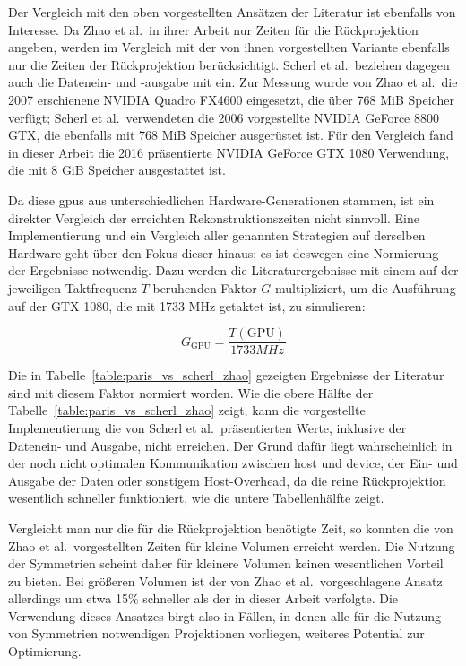 Der Vergleich mit den oben vorgestellten Ansätzen der Literatur ist ebenfalls von Interesse. Da Zhao et al.\ in ihrer
Arbeit nur Zeiten für die Rückprojektion angeben, werden im Vergleich mit der von ihnen vorgestellten Variante ebenfalls
nur die Zeiten der Rückprojektion berücksichtigt. Scherl et al.\ beziehen dagegen auch die Datenein- und -ausgabe mit
ein. Zur Messung wurde von Zhao et al.\ die 2007 erschienene NVIDIA Quadro FX4600 eingesetzt, die über 768 MiB Speicher
verfügt; Scherl et al.\ verwendeten die 2006 vorgestellte NVIDIA GeForce 8800 GTX, die ebenfalls mit 768 MiB Speicher
ausgerüstet ist. Für den Vergleich fand in dieser Arbeit die 2016 präsentierte NVIDIA GeForce GTX 1080 Verwendung, die
mit 8 GiB Speicher ausgestattet ist.

Da diese \gls{gpu}s aus unterschiedlichen Hardware-Generationen stammen, ist ein direkter Vergleich der erreichten
Rekonstruktionszeiten nicht sinnvoll. Eine Implementierung und ein Vergleich aller genannten Strategien auf derselben
Hardware geht über den Fokus dieser hinaus; es ist deswegen eine Normierung der Ergebnisse notwendig. Dazu werden die
Literaturergebnisse mit einem auf der jeweiligen Taktfrequenz $T$ beruhenden Faktor $G$ multipliziert, um die Ausführung
auf der GTX 1080, die mit 1733 MHz getaktet ist, zu simulieren:

\begin{equation*}
    G_{\text{GPU}} = \frac{T(\text{GPU})}{1733 MHz}
\end{equation*}

Die in Tabelle~\ref{table:paris_vs_scherl_zhao} gezeigten Ergebnisse der Literatur sind mit diesem Faktor normiert
worden. Wie die obere Hälfte der Tabelle~\ref{table:paris_vs_scherl_zhao} zeigt, kann die vorgestellte Implementierung
die von Scherl et al.\ präsentierten Werte, inklusive der Datenein- und Ausgabe, nicht erreichen. Der Grund dafür liegt
wahrscheinlich in der noch nicht optimalen Kommunikation zwischen \gls{host} und \gls{device}, der Ein- und Ausgabe der
Daten oder sonstigem Host-Overhead, da die reine Rückprojektion wesentlich schneller funktioniert, wie die untere
Tabellenhälfte zeigt.

Vergleicht man nur die für die Rückprojektion benötigte Zeit, so konnten die von Zhao et al.\ vorgestellten Zeiten für
kleine Volumen erreicht werden. Die Nutzung der Symmetrien scheint daher für kleinere Volumen keinen wesentlichen
Vorteil zu bieten. Bei größeren Volumen ist der von Zhao et al.\ vorgeschlagene Ansatz allerdings um etwa 15\% schneller
als der in dieser Arbeit verfolgte. Die Verwendung dieses Ansatzes birgt also in Fällen, in denen alle für die Nutzung
von Symmetrien notwendigen Projektionen vorliegen, weiteres Potential zur Optimierung.

